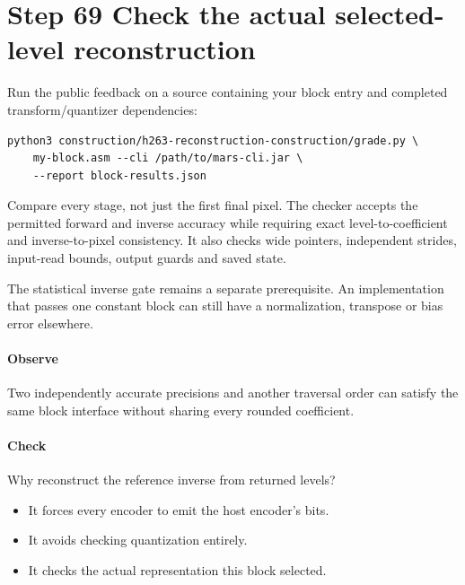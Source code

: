 \section{Step 69 Check the actual selected-level reconstruction}\label{h263-block-s09}
Run the public feedback on a source containing your block entry and completed
transform/quantizer dependencies:
\begin{verbatim}
python3 construction/h263-reconstruction-construction/grade.py \
    my-block.asm --cli /path/to/mars-cli.jar \
    --report block-results.json
\end{verbatim}
Compare every stage, not just the first final pixel. The checker accepts the
permitted forward and inverse accuracy while requiring exact level-to-coefficient
and inverse-to-pixel consistency. It also checks wide pointers, independent
strides, input-read bounds, output guards and saved state.

The statistical inverse gate remains a separate prerequisite. An implementation
that passes one constant block can still have a normalization, transpose or bias
error elsewhere.

\paragraph{Observe} Two independently accurate precisions and another traversal
order can satisfy the same block interface without sharing every rounded coefficient.
\Needspace{8\baselineskip}
\paragraph{Check} Why reconstruct the reference inverse from returned levels?
\begin{itemize}
  \item[A.] It forces every encoder to emit the host encoder's bits.
  \item[B.] It avoids checking quantization entirely.
  \item[C.] It checks the actual representation this block selected.
\end{itemize}
